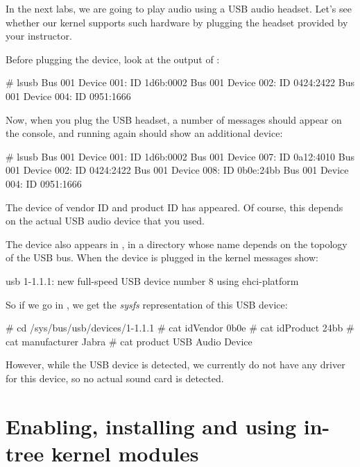 {In the next labs, we are going to play audio using a USB audio headset.
Let's see whether our kernel supports such hardware by plugging the
headset provided by your instructor.

Before plugging the device, look at the output of :

\begin{bashinput}
# lsusb
Bus 001 Device 001: ID 1d6b:0002
Bus 001 Device 002: ID 0424:2422 
Bus 001 Device 004: ID 0951:1666
\end{bashinput}

Now, when you plug the USB headset, a number of messages should appear
on the console, and running  again should show an
additional device:

\begin{bashinput}
# lsusb
Bus 001 Device 001: ID 1d6b:0002
Bus 001 Device 007: ID 0a12:4010 
Bus 001 Device 002: ID 0424:2422 
Bus 001 Device 008: ID 0b0e:24bb
Bus 001 Device 004: ID 0951:1666 
\end{bashinput}

The device of vendor ID  and product ID  has
appeared. Of course, this depends on the actual USB audio device
that you used.

The device also appears in , in a
directory whose name depends on the topology of the USB bus. When the
device is plugged in the kernel messages show:

\begin{bashinput}
usb 1-1.1.1: new full-speed USB device number 8 using ehci-platform
\end{bashinput}

So if we go in , we get the {\em
sysfs} representation of this USB device:

\begin{bashinput}
# cd /sys/bus/usb/devices/1-1.1.1
# cat idVendor
0b0e
# cat idProduct
24bb
# cat manufacturer
Jabra
# cat product
USB Audio Device
\end{bashinput}

However, while the USB device is detected, we currently do not have
any driver for this device, so no actual sound card is detected.

\section{Enabling, installing and using in-tree kernel modules}

}
